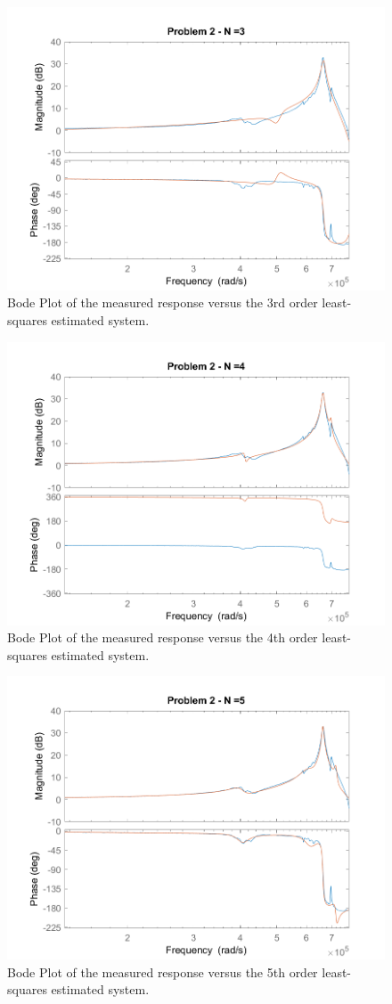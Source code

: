 \documentclass[]{article}
\begin{document}
		\begin{figure}[h]
			\centering
			\includegraphics[width=0.7\linewidth]{fig/MECH6325_CA1_pblm2_n=3}
			\caption{Bode Plot of the measured response versus the 3rd order least-squares estimated system.}
			\label{fig:pblm2_n=3}
		\end{figure}

		\begin{figure}[h]
			\centering
			\includegraphics[width=0.7\linewidth]{fig/MECH6325_CA1_pblm2_n=4}
			\caption{Bode Plot of the measured response versus the 4th order least-squares estimated system.}
			\label{fig:pblm2_n=4}
		\end{figure}

		\begin{figure}[h]
			\centering
			\includegraphics[width=0.7\linewidth]{fig/MECH6325_CA1_pblm2_n=5}
			\caption{Bode Plot of the measured response versus the 5th order least-squares estimated system.}
			\label{fig:pblm2_n=5}
		\end{figure}
\end{document}
